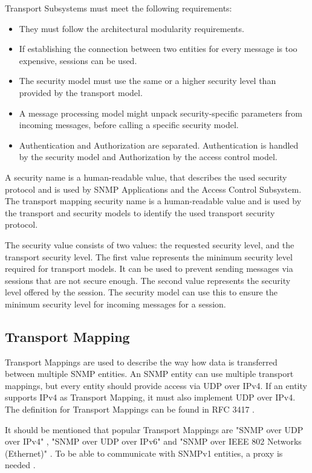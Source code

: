 Transport Subsystems must meet the following requirements:
\begin{itemize}
    \item They must follow the architectural modularity requirements.
    \item If establishing the connection between two entities for every message is too expensive, sessions can be used.
    \item The security model must use the same or a higher security level than provided by the transport model.
    \item A message processing model might unpack security-specific parameters from incoming messages, before calling a specific security model.
    \item Authentication and Authorization are separated. Authentication is handled by the security model and Authorization by the access control model.
\end{itemize}

A security name is a human-readable value, that describes the used security protocol and is used by SNMP Applications and the Access Control Subsystem. The transport mapping security name is a human-readable value and is used by the transport and security models to identify the used transport security protocol.

\newpage
The security value consists of two values: the requested security level, and the transport security level. The first value represents the minimum security level required for transport models. It can be used to prevent sending messages via sessions that are not secure enough. The second value represents the security level offered by the session. The security model can use this to ensure the minimum security level for incoming messages for a session.

\subsection{Transport Mapping}
\label{Section:SNMP-TransportMapping}

Transport Mappings are used to describe the way how data is transferred between multiple SNMP entities. An SNMP entity can use multiple transport mappings, but every entity should provide access via UDP over IPv4. If an entity supports IPv4 as Transport Mapping, it must also implement UDP over IPv4. The definition for Transport Mappings can be found in RFC 3417 \cite{RFC:RFC3147:2002}.

It should be mentioned that popular Transport Mappings are "SNMP over UDP over IPv4" \cite{RFC:RFC3147:2002}, "SNMP over UDP over IPv6" \cite{RFC:RFC3147:2002} and "SNMP over IEEE 802 Networks (Ethernet)" \cite{RFC:RFC4789:2006}. To be able to communicate with SNMPv1 entities, a proxy is needed \cite{RFC:RFC2576:2000}. 